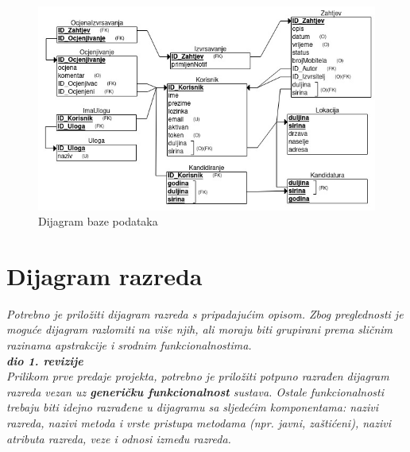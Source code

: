 			
			\begin{figure}[H]
				\includegraphics[scale=0.77]{slike/baza_podataka.jpeg} %
				\centering
				\caption {Dijagram baze podataka}
				\label{fig:promjene}
			\end{figure}
			
			\eject
			
			
		\section{Dijagram razreda}
		
			\textit{Potrebno je priložiti dijagram razreda s pripadajućim opisom. Zbog preglednosti je moguće dijagram razlomiti na više njih, ali moraju biti grupirani prema sličnim razinama apstrakcije i srodnim funkcionalnostima.}\\
			
			\textbf{\textit{dio 1. revizije}}\\
			
			\textit{Prilikom prve predaje projekta, potrebno je priložiti potpuno razrađen dijagram razreda vezan uz \textbf{generičku funkcionalnost} sustava. Ostale funkcionalnosti trebaju biti idejno razrađene u dijagramu sa sljedećim komponentama: nazivi razreda, nazivi metoda i vrste pristupa metodama (npr. javni, zaštićeni), nazivi atributa razreda, veze i odnosi između razreda.}\\
			
			

			

